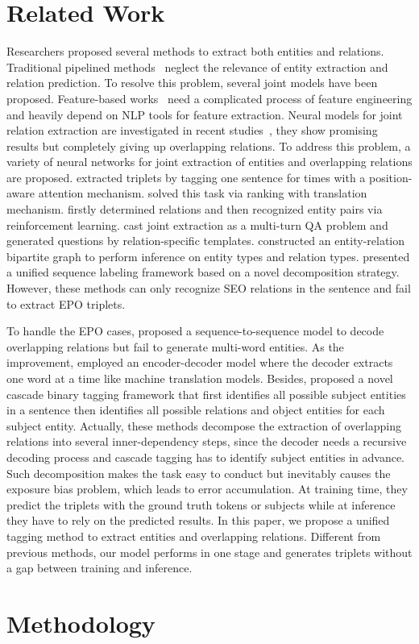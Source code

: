 \documentclass[11pt]{article}
\begin{document}
 \section{Related Work}
Researchers proposed several methods to extract both entities and relations.
Traditional pipelined methods~\cite{zelenko2003kernel,chan2011exploiting} neglect the relevance of entity extraction and relation prediction. 
To resolve this problem, several joint models have been proposed. 
Feature-based works~\cite{yu2010jointly,miwa2014modeling} need a complicated process of feature engineering and heavily depend on NLP tools for feature extraction. 
Neural models for joint relation extraction are investigated in recent studies~\cite{gupta2016table,zheng2017joint}, they show promising results but completely giving up overlapping relations. 
To address this problem, a variety of neural networks for joint extraction of entities and overlapping relations are proposed. 
 extracted triplets by tagging one sentence for  times with a position-aware attention mechanism. 
 solved this task via ranking with translation mechanism. 
 firstly determined relations and then recognized entity pairs via reinforcement learning. 
 cast joint extraction as a multi-turn QA problem and generated questions by relation-specific templates. 
 constructed an entity-relation bipartite graph to perform inference on entity types and relation types. 
 presented a unified sequence labeling framework based on a novel decomposition strategy.
However, these methods can only recognize SEO relations in the sentence and fail to extract EPO triplets.

To handle the EPO cases,  proposed a sequence-to-sequence model to decode overlapping relations but fail to generate multi-word entities.
As the improvement,  employed an encoder-decoder model where the decoder extracts one word at a time like machine translation models.
Besides,  proposed a novel cascade binary tagging framework that first identifies all possible subject entities in a sentence then identifies all possible relations and object entities for each subject entity.
Actually, these methods decompose the extraction of overlapping relations into several inner-dependency steps, since the decoder needs a recursive decoding process and cascade tagging has to identify subject entities in advance.
Such decomposition makes the task easy to conduct but inevitably causes the exposure bias problem, which leads to error accumulation. 
At training time, they predict the triplets with the ground truth tokens or subjects while at inference they have to rely on the predicted results.
In this paper, we propose a unified tagging method to extract entities and overlapping relations.
Different from previous methods, our model performs in one stage and generates triplets without a gap between training and inference. \section{Methodology}
\end{document}
